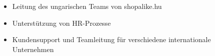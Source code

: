 \documentclass[10pt,a4paper,ragged2e,withhyper]{altacv}
\begin{document}
\begin{paracol}{2}
\medskip

\begin{itemize}
  \item Leitung des ungarischen Teams von shopalike.hu
\end{itemize}

\medskip

\begin{itemize}
  \item Unterstützung von HR-Prozesse
\end{itemize}


\begin{itemize}
  \item Kundensupport und Teamleitung für verschiedene internationale Unternehmen
\end{itemize}








\end{paracol}
\end{document}
